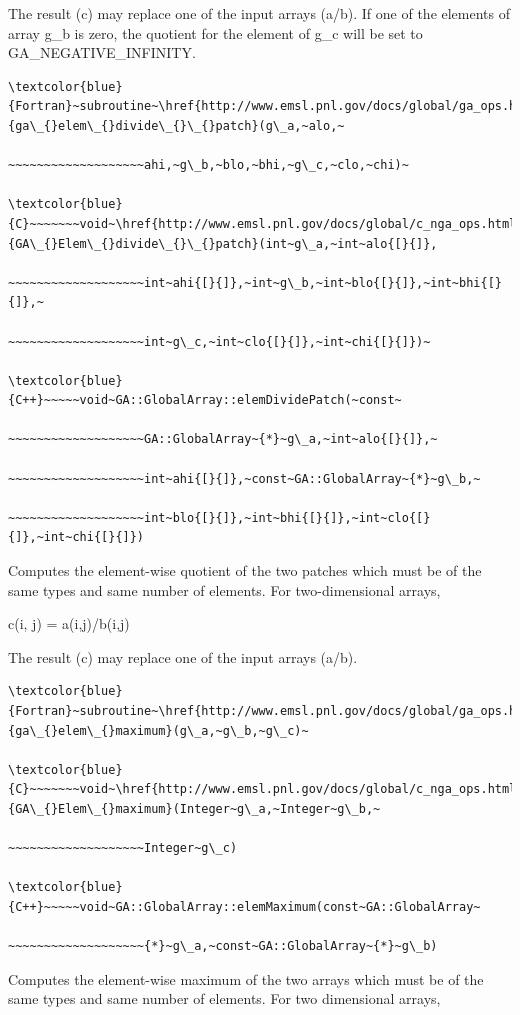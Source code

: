 The result (c) may replace one of the input arrays (a/b). If one of
the elements of array g\_b is zero, the quotient for the element of
g\_c will be set to GA\_NEGATIVE\_INFINITY. 
\begin{verbatim}
\textcolor{blue}{Fortran}~subroutine~\href{http://www.emsl.pnl.gov/docs/global/ga_ops.html\#ga_elem_divide_patch}{ga\_{}elem\_{}divide\_{}\_{}patch}(g\_a,~alo,~

~~~~~~~~~~~~~~~~~~~ahi,~g\_b,~blo,~bhi,~g\_c,~clo,~chi)~

\textcolor{blue}{C}~~~~~~~void~\href{http://www.emsl.pnl.gov/docs/global/c_nga_ops.html\#ga_elem_divide_patch}{GA\_{}Elem\_{}divide\_{}\_{}patch}(int~g\_a,~int~alo{[}{]},

~~~~~~~~~~~~~~~~~~~int~ahi{[}{]},~int~g\_b,~int~blo{[}{]},~int~bhi{[}{]},~

~~~~~~~~~~~~~~~~~~~int~g\_c,~int~clo{[}{]},~int~chi{[}{]})~

\textcolor{blue}{C++}~~~~~void~GA::GlobalArray::elemDividePatch(~const~

~~~~~~~~~~~~~~~~~~~GA::GlobalArray~{*}~g\_a,~int~alo{[}{]},~

~~~~~~~~~~~~~~~~~~~int~ahi{[}{]},~const~GA::GlobalArray~{*}~g\_b,~

~~~~~~~~~~~~~~~~~~~int~blo{[}{]},~int~bhi{[}{]},~int~clo{[}{]},~int~chi{[}{]})
\end{verbatim}
Computes the element-wise quotient of the two patches which must be
of the same types and same number of elements. For two-dimensional
arrays,

c(i, j) = a(i,j)/b(i,j)

The result (c) may replace one of the input arrays (a/b). 
\begin{verbatim}
\textcolor{blue}{Fortran}~subroutine~\href{http://www.emsl.pnl.gov/docs/global/ga_ops.html\#ga_elem_maximum}{ga\_{}elem\_{}maximum}(g\_a,~g\_b,~g\_c)~

\textcolor{blue}{C}~~~~~~~void~\href{http://www.emsl.pnl.gov/docs/global/c_nga_ops.html\#ga_elem_maximum}{GA\_{}Elem\_{}maximum}(Integer~g\_a,~Integer~g\_b,~

~~~~~~~~~~~~~~~~~~~Integer~g\_c)

\textcolor{blue}{C++}~~~~~void~GA::GlobalArray::elemMaximum(const~GA::GlobalArray~

~~~~~~~~~~~~~~~~~~~{*}~g\_a,~const~GA::GlobalArray~{*}~g\_b)
\end{verbatim}
Computes the element-wise maximum of the two arrays which must be
of the same types and same number of elements. For two dimensional
arrays,

